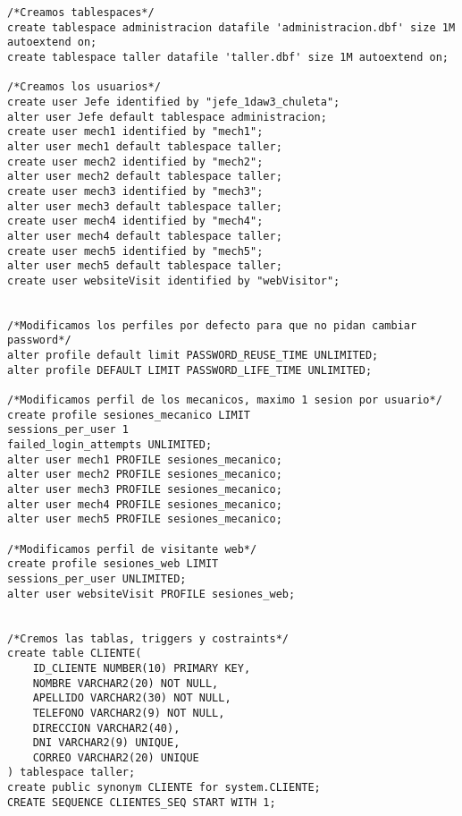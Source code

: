 \begin{lstlisting}[caption=Script .sql para crear la BD.]
    /*Creamos tablespaces*/
create tablespace administracion datafile 'administracion.dbf' size 1M autoextend on;
create tablespace taller datafile 'taller.dbf' size 1M autoextend on;

/*Creamos los usuarios*/
create user Jefe identified by "jefe_1daw3_chuleta";
alter user Jefe default tablespace administracion;
create user mech1 identified by "mech1";
alter user mech1 default tablespace taller;
create user mech2 identified by "mech2";
alter user mech2 default tablespace taller;
create user mech3 identified by "mech3";
alter user mech3 default tablespace taller;
create user mech4 identified by "mech4";
alter user mech4 default tablespace taller;
create user mech5 identified by "mech5";
alter user mech5 default tablespace taller;
create user websiteVisit identified by "webVisitor";


/*Modificamos los perfiles por defecto para que no pidan cambiar password*/
alter profile default limit PASSWORD_REUSE_TIME UNLIMITED;
alter profile DEFAULT LIMIT PASSWORD_LIFE_TIME UNLIMITED;

/*Modificamos perfil de los mecanicos, maximo 1 sesion por usuario*/
create profile sesiones_mecanico LIMIT
sessions_per_user 1
failed_login_attempts UNLIMITED;
alter user mech1 PROFILE sesiones_mecanico;
alter user mech2 PROFILE sesiones_mecanico;
alter user mech3 PROFILE sesiones_mecanico;
alter user mech4 PROFILE sesiones_mecanico;
alter user mech5 PROFILE sesiones_mecanico;

/*Modificamos perfil de visitante web*/
create profile sesiones_web LIMIT
sessions_per_user UNLIMITED;
alter user websiteVisit PROFILE sesiones_web;


/*Cremos las tablas, triggers y costraints*/
create table CLIENTE(
    ID_CLIENTE NUMBER(10) PRIMARY KEY,
    NOMBRE VARCHAR2(20) NOT NULL,
    APELLIDO VARCHAR2(30) NOT NULL,
    TELEFONO VARCHAR2(9) NOT NULL,
    DIRECCION VARCHAR2(40),
    DNI VARCHAR2(9) UNIQUE,
    CORREO VARCHAR2(20) UNIQUE
) tablespace taller;
create public synonym CLIENTE for system.CLIENTE;
CREATE SEQUENCE CLIENTES_SEQ START WITH 1;


\end{lstlisting}
